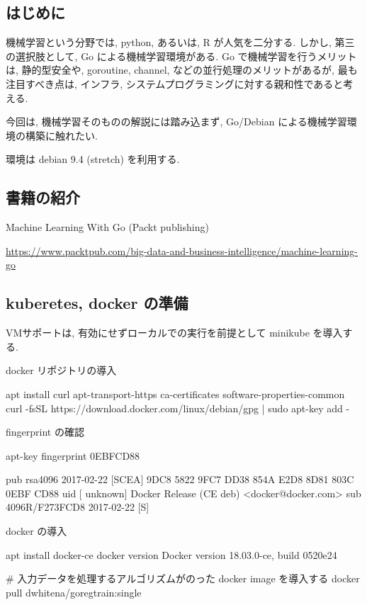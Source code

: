 \documentclass[mingoth,a4paper]{jsarticle}
\begin{document}

\subsection{はじめに}
機械学習という分野では, python, あるいは, R が人気を二分する.
しかし, 第三の選択肢として, Go による機械学習環境がある.
Go で機械学習を行うメリットは, 静的型安全や, goroutine, channel, などの並行処理のメリットがあるが, 最も注目すべき点は, インフラ, システムプログラミングに対する親和性であると考える.

今回は, 機械学習そのものの解説には踏み込まず, Go/Debian による機械学習環境の構築に触れたい.

環境は debian 9.4 (stretch) を利用する.

\subsection{書籍の紹介}
Machine Learning With Go (Packt publishing)

\url{https://www.packtpub.com/big-data-and-business-intelligence/machine-learning-go}

\subsection{kuberetes, docker の準備}
VMサポートは, 有効にせずローカルでの実行を前提として minikube を導入する.

docker リポジトリの導入
\begin{commandline}
apt install curl apt-transport-https ca-certificates software-properties-common
curl -fsSL https://download.docker.com/linux/debian/gpg | sudo apt-key add -
\end{commandline}

fingerprint の確認
\begin{commandline}
apt-key fingerprint 0EBFCD88

pub   rsa4096 2017-02-22 [SCEA]
      9DC8 5822 9FC7 DD38 854A  E2D8 8D81 803C 0EBF CD88
uid           [ unknown] Docker Release (CE deb) <docker@docker.com>
sub   4096R/F273FCD8 2017-02-22 [S]
\end{commandline}

docker の導入
\begin{commandline}
apt install docker-ce
docker version
Docker version 18.03.0-ce, build 0520e24

# 入力データを処理するアルゴリズムがのった docker image を導入する
docker pull dwhitena/goregtrain:single
\end{commandline}
\end{document}
